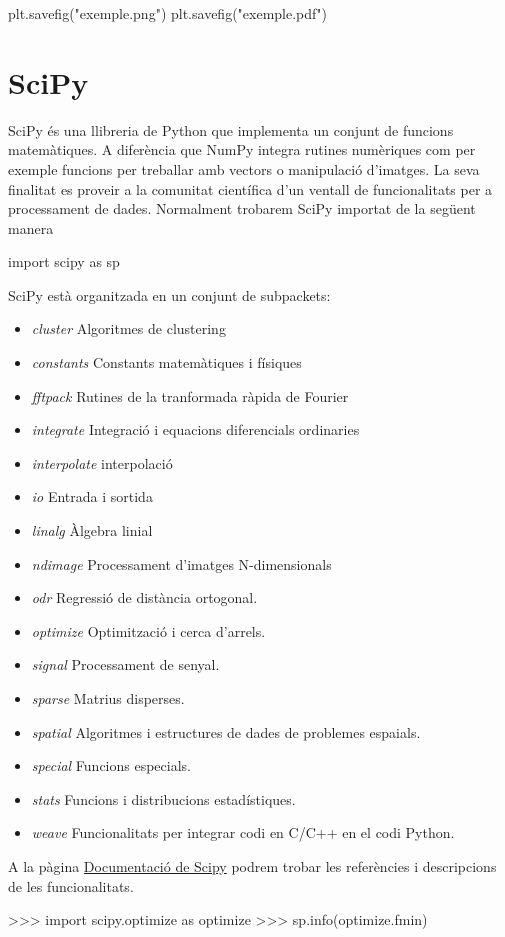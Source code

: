 \begin{blockcode}
plt.savefig("exemple.png")
plt.savefig("exemple.pdf")
\end{blockcode}

\section{SciPy}
SciPy és una llibreria de Python que implementa un conjunt de funcions matemàtiques. A diferència que NumPy integra rutines numèriques com per exemple funcions per treballar amb vectors  o manipulació d'imatges. La seva finalitat es proveir a la comunitat científica d'un ventall de funcionalitats per a processament de dades. Normalment trobarem SciPy importat de la següent manera

\begin{blockcode}
import scipy as sp
\end{blockcode}
SciPy està organitzada en un conjunt de subpackets:
\begin{itemize}
\item \emph{cluster} Algoritmes de clustering
\item \emph{constants} Constants matemàtiques i físiques
\item \emph{fftpack} Rutines de la tranformada ràpida de Fourier
\item \emph{integrate} Integració i equacions diferencials ordinaries
\item \emph{interpolate} interpolació
\item \emph{io} Entrada i sortida
\item \emph{linalg} Àlgebra linial
\item \emph{ndimage} Processament d'imatges N-dimensionals
\item \emph{odr} Regressió de distància ortogonal.
\item \emph{optimize} Optimització i cerca d'arrels.
\item \emph{signal} Processament de senyal.
\item \emph{sparse} Matrius disperses.
\item \emph{spatial} Algoritmes i estructures de dades de problemes espaials.
\item \emph{special} Funcions especials.
\item \emph{stats} Funcions i distribucions estadístiques.
\item \emph{weave} Funcionalitats per integrar codi en C/C++ en el codi Python.
\end{itemize}
A la pàgina \href{http://docs.scipy.org/doc/scipy/reference/tutorial/}{Documentació de Scipy} podrem trobar les referències i descripcions de les funcionalitats.
\begin{blockcode}
>>> import scipy.optimize as optimize
>>> sp.info(optimize.fmin)
\end{blockcode}





